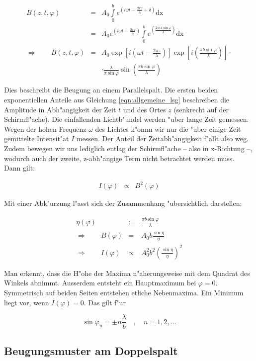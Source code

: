 		\begin{eqnarray}
			B(z, t, \varphi) & = & A_0 \int \limits_0^b e^{\left(i \omega t - \frac{2 \pi z}{\lambda} + \delta \right)} \mathrm{dx} \nonumber \\
			& = & A_0 e^{\left(i \omega t - \frac{2 \pi z}{\lambda}\right)} \int \limits_0^b e^{\left(\frac{2 \pi i x \sin{\varphi}}{\lambda}\right)} \mathrm{dx} \nonumber\\
			\Rightarrow \qquad
			B(z, t, \varphi) & = & A_0 \exp{\left[ i \left( \omega t - \frac{2\pi z}{\lambda}
			\right) \right] }
			\exp{\left[i \left( \frac{\pi b \sin{\varphi}}{\lambda} \right)\right]} \cdot \nonumber \\ 
			& & \cdot \frac{\lambda}{\pi \sin{\varphi}}
			\sin{\left( \frac{\pi b \sin{\varphi}}{\lambda} \right)} \label{eqn:allgemeine_lsg}
		\end{eqnarray}

		Dies beschreibt die Beugung an einem Parallelspalt.
		Die ersten beiden exponentiellen Anteile aus Gleichung \ref{eqn:allgemeine_lsg} beschreiben die Amplitude in Abh"angigkeit der Zeit $t$ und des Ortes $z$ (senkrecht auf der Schirmfl"ache).
		Die einfallenden Lichtb"undel werden "uber lange Zeit gemessen.\\
		Wegen der hohen Frequenz $\omega$ des Lichtes k"onnn wir nur die "uber einige Zeit gemittelte Intensit"at $I$ messen. Der Anteil der Zeitabh"angigkeit f"allt also weg.\\
		Zudem bewegen wir uns lediglich entlag der Schirmfl"ache -- also in x-Richtung --, wodurch auch der zweite, z-abh"angige Term nicht betrachtet werden muss.\\
		Dann gilt:

		\begin{eqnarray}
			I(\varphi) & \propto & B^2(\varphi) \nonumber
		\end{eqnarray}

		Mit einer Abk"urzung l"asst sich der Zusammenhang "ubersichtlich darstellen:

		\begin{eqnarray}
			\eta(\varphi) & := & \frac{\pi b \sin{\varphi}}{\lambda} \nonumber \\
			\Rightarrow \qquad
			B(\varphi) & = & A_0 b \frac{\sin{\eta}}{\eta} \nonumber \\
			\Rightarrow \qquad
			I(\varphi) & \propto & A_0^2 b^2 \left(\frac{\sin{\eta}}{\eta}\right)^2
		\end{eqnarray}

		Man erkennt, dass die H"ohe der Maxima n"aherungsweise mit dem Quadrat des Winkels abnimmt.
		Ausserdem entsteht ein Hauptmaximum bei $\varphi = 0$. Symmetrisch auf beiden Seiten entstehen etliche Nebenmaxima.
		Ein Minimum liegt vor, wenn $I(\varphi) = 0$. Das gilt f"ur

		\begin{equation}
			\sin{\varphi_n} = \pm n \frac{\lambda}{b} \quad , \quad n = 1, 2, \dots
		\end{equation}


	\subsection{Beugungsmuster am Doppelspalt}